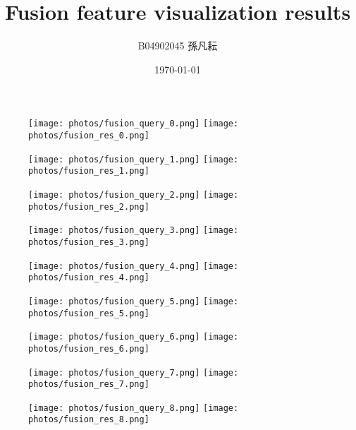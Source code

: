 \documentclass{article}
\begin{document}
\title{Fusion feature visualization results}
\author{B04902045 孫凡耘}
\date{\today}
\maketitle
\begin{figure}[!ht]
  \centering
  \texttt{[image: photos/fusion\_query\_0.png]}
  \texttt{[image: photos/fusion\_res\_0.png]}
\end{figure}

\begin{figure}[!ht]
  \centering
  \texttt{[image: photos/fusion\_query\_1.png]}
  \texttt{[image: photos/fusion\_res\_1.png]}
\end{figure}

\begin{figure}[!ht]
  \centering
  \texttt{[image: photos/fusion\_query\_2.png]}
  \texttt{[image: photos/fusion\_res\_2.png]}
\end{figure}

\begin{figure}[!ht]
  \centering
  \texttt{[image: photos/fusion\_query\_3.png]}
  \texttt{[image: photos/fusion\_res\_3.png]}
\end{figure}

\begin{figure}[!ht]
  \centering
  \texttt{[image: photos/fusion\_query\_4.png]}
  \texttt{[image: photos/fusion\_res\_4.png]}
\end{figure}

\begin{figure}[!ht]
  \centering
  \texttt{[image: photos/fusion\_query\_5.png]}
  \texttt{[image: photos/fusion\_res\_5.png]}
\end{figure}

\begin{figure}[!ht]
  \centering
  \texttt{[image: photos/fusion\_query\_6.png]}
  \texttt{[image: photos/fusion\_res\_6.png]}
\end{figure}

\begin{figure}[!ht]
  \centering
  \texttt{[image: photos/fusion\_query\_7.png]}
  \texttt{[image: photos/fusion\_res\_7.png]}
\end{figure}

\begin{figure}[!ht]
  \centering
  \texttt{[image: photos/fusion\_query\_8.png]}
  \texttt{[image: photos/fusion\_res\_8.png]}
\end{figure}
\end{document}
